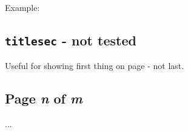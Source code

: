 Example:
\begin{latex}
\lhead[]{\today}
\rhead[\today]{}
\lfoot[\thepage]{}
\rfoot[]{\thepage}
\end{latex}

\subsection[\texttt{titlesec}]{\texttt{titlesec} - not tested \noncurs}
Useful for showing first thing on page - not last.
\begin{latex}
\usepackage[pagestyles]{titlesec}
\end{latex}

\subsection{Page \emph{n} of \emph{m}}
\begin{latex}
\usepackage{lastpage}
...
\end{latex}
\fancyhf{}
\lhead{\nouppercase{\leftmark}}
\rhead{\nouppercase{\rightmark}}
\cfoot{\thepage}